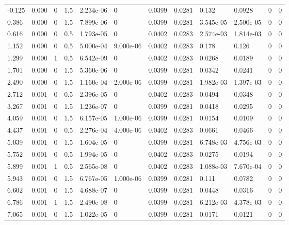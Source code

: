 \documentclass[preview]{standalone}
\begin{document}
{{\begin{tabular}{L{1.2cm}C{1.2cm} C{0.3cm}C{0.5cm} C{1.4cm}C{1.4cm} C{1.4cm}C{1.4cm} C{1.6cm}C{1.6cm} C{1.6cm}C{1.6cm}}
  -0.125  &  0.000  & 0     & 1.5 &  2.234e-06  & 0  &  0.0399&   0.0281& 0.132 & 0.0928   &  0 & 0  \\ 
  0.386  &  0.000  & 0     & 1.5 &  7.899e-06  & 0  &  0.0399&   0.0281& 3.545e-05 & 2.500e-05   &  0 & 0  \\ 
  0.616  &  0.000  & 0     & 0.5 &  1.793e-05  & 0  &  0.0402&   0.0283& 2.574e-03 & 1.814e-03   &  0 & 0  \\ 
  1.152  &  0.000  & 0     & 0.5 &  5.000e-04  & 9.000e-06  &  0.0402&   0.0283& 0.178 & 0.126   &  0 & 0  \\ 
  1.299  &  0.000  & 1     & 0.5 &  6.542e-09  & 0  &  0.0402&   0.0283& 0.0268 & 0.0189   &  0 & 0  \\ 
  1.701  &  0.000  & 0     & 1.5 &  5.360e-06  & 0  &  0.0399&   0.0281& 0.0342 & 0.0241   &  0 & 0  \\ 
  2.490  &  0.000  & 0     & 1.5 &  1.160e-04  & 2.000e-06  &  0.0399&   0.0281& 1.982e-03 & 1.397e-03   &  0 & 0  \\ 
  2.712  &  0.001  & 0     & 0.5 &  2.396e-05  & 0  &  0.0402&   0.0283& 0.0494 & 0.0348   &  0 & 0  \\ 
  3.267  &  0.001  & 0     & 1.5 &  1.236e-07  & 0  &  0.0399&   0.0281& 0.0418 & 0.0295   &  0 & 0  \\ 
  4.059  &  0.001  & 0     & 1.5 &  6.157e-05  & 1.000e-06  &  0.0399&   0.0281& 0.0154 & 0.0109   &  0 & 0  \\ 
  4.437  &  0.001  & 0     & 0.5 &  2.276e-04  & 4.000e-06  &  0.0402&   0.0283& 0.0661 & 0.0466   &  0 & 0  \\ 
  5.039  &  0.001  & 0     & 1.5 &  1.604e-05  & 0  &  0.0399&   0.0281& 6.748e-03 & 4.756e-03   &  0 & 0  \\ 
  5.752  &  0.001  & 0     & 0.5 &  1.994e-05  & 0  &  0.0402&   0.0283& 0.0275 & 0.0194   &  0 & 0  \\ 
  5.899  &  0.001  & 1     & 0.5 &  2.565e-08  & 0  &  0.0402&   0.0283& 1.088e-03 & 7.670e-04   &  0 & 0  \\ 
  5.943  &  0.001  & 0     & 1.5 &  6.767e-05  & 1.000e-06  &  0.0399&   0.0281& 0.111 & 0.0782   &  0 & 0  \\ 
  6.602  &  0.001  & 0     & 1.5 &  4.688e-07  & 0  &  0.0399&   0.0281& 0.0448 & 0.0316   &  0 & 0  \\ 
  6.786  &  0.001  & 1     & 1.5 &  2.490e-08  & 0  &  0.0399&   0.0281& 6.212e-03 & 4.378e-03   &  0 & 0  \\ 
  7.065  &  0.001  & 0     & 1.5 &  1.022e-05  & 0  &  0.0399&   0.0281& 0.0171 & 0.0121   &  0 & 0  \\ 

\end{tabular}}}
\end{document}

